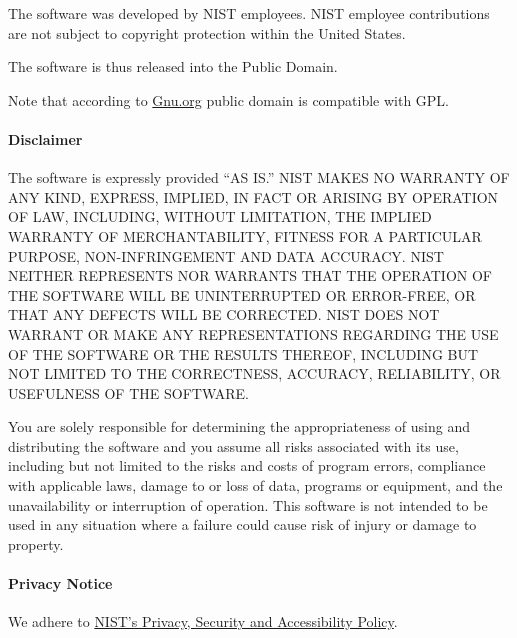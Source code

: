 \documentclass{article}
\begin{document}
The software was developed by NIST employees. NIST employee
contributions are not subject to copyright protection within the
United States.

The software is thus released into the Public Domain.

Note that according to
\href{http://www.gnu.org/licences/license-list.html#PublicDomain}{Gnu.org}
public domain is compatible with GPL.

\paragraph{Disclaimer}
The software is expressly provided ``AS IS.'' NIST MAKES NO WARRANTY OF
ANY KIND, EXPRESS, IMPLIED, IN FACT OR ARISING BY OPERATION OF LAW,
INCLUDING, WITHOUT LIMITATION, THE IMPLIED WARRANTY OF
MERCHANTABILITY, FITNESS FOR A PARTICULAR PURPOSE, NON-INFRINGEMENT
AND DATA ACCURACY. NIST NEITHER REPRESENTS NOR WARRANTS THAT THE
OPERATION OF THE SOFTWARE WILL BE UNINTERRUPTED OR ERROR-FREE, OR THAT
ANY DEFECTS WILL BE CORRECTED. NIST DOES NOT WARRANT OR MAKE ANY
REPRESENTATIONS REGARDING THE USE OF THE SOFTWARE OR THE RESULTS
THEREOF, INCLUDING BUT NOT LIMITED TO THE CORRECTNESS, ACCURACY,
RELIABILITY, OR USEFULNESS OF THE SOFTWARE.

You are solely responsible for determining the appropriateness of
using and distributing the software and you assume all risks
associated with its use, including but not limited to the risks and
costs of program errors, compliance with applicable laws, damage to or
loss of data, programs or equipment, and the unavailability or
interruption of operation. This software is not intended to be used in
any situation where a failure could cause risk of injury or damage to
property.

\paragraph{Privacy Notice}
We adhere to \href{http://www.nist.gov/public_affairs/privacy.cfm}{NIST's Privacy, Security and Accessibility Policy}.
\end{document}
